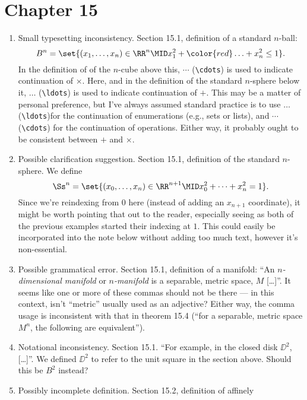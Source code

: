 \documentclass{fkletter}
\begin{document}
\section*{Chapter 15}
\begin{enumerate}
  \item Small typesetting inconsistency. Section 15.1, definition of a standard
    $n$-ball:
    \[
      B^n = \set{(x_1, \ldots, x_n) \in \RR^n \MID x_1^2 + {\color{red} \ldots}
        + x_n^2 \leq 1}.
    \]
    In the definition of of the $n$-cube above this, {\color{red}$\cdots$
    (\verb|\cdots|) is used to indicate continuation of $\times$. Here, and in
    the definition of the standard $n$-sphere below it, $\ldots$ (\verb|\ldots|)
    is used to indicate continuation of $+$.} This may be a matter of personal
    preference, but I've always assumed standard practice is to use $\ldots$
    (\verb|\ldots|)for the continuation of enumerations (e.g., sets or lists),
    and $\cdots$ (\verb|\cdots|) for the continuation of operations. Either way,
    it probably ought to be consistent between $+$ and $\times$.
  \item Possible clarification suggestion. Section 15.1, definition of the
    standard $n$-sphere. We define
    \[
      \Ss^n = \set{(x_0, \ldots, x_n) \in \RR^{n+1} \MID x_0^2 + \cdots + x_n^2
        = 1}.
    \]
    {\color{red}Since we're reindexing from $0$ here (instead of adding an
      $x_{n+1}$ coordinate), it might be worth pointing that out to the reader,
      especially seeing as both of the previous examples started their indexing
      at $1$.} This could easily be incorporated into the note below without
    adding too much text, however it's non-essential.
  \item Possible grammatical error. Section 15.1, definition of a manifold: ``An
    \emph{$n$-dimensional manifold} or \emph{$n$-manifold} is a {\color{red}
      separable, metric space, $M$} [\ldots]''. It seems like one or more of
    these commas should not be there --- in this context, isn't ``metric'' usually
    used as an adjective? Either way, the comma usage is inconsistent with that
    in theorem 15.4 (``for a separable, metric space $M^n$, the following are
    equivalent'').
  \item Notational inconsistency. Section 15.1. ``For example, in the
    {\color{red} closed disk $\DD^2$}, [\ldots]''. We defined $\DD^2$ to refer
    to the unit square in the section above. Should this be $B^2$ instead?
  \item Possibly incomplete definition. Section 15.2, definition of affinely

\end{enumerate}
\end{document}
